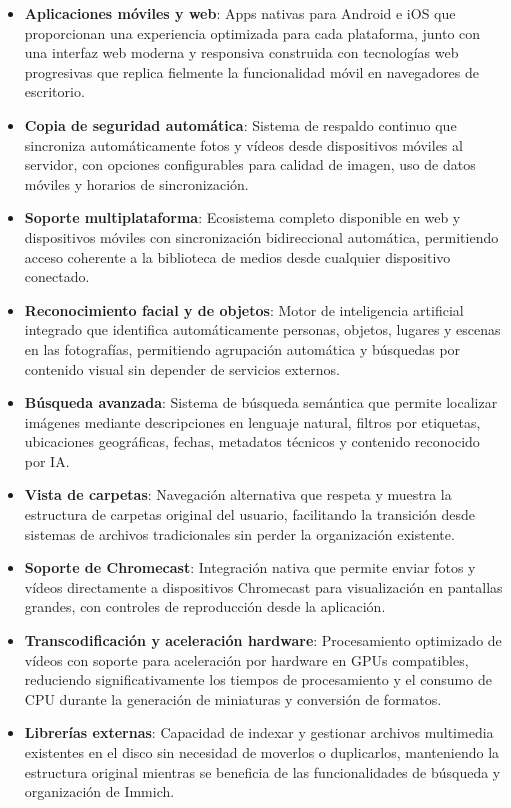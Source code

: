 \begin{itemize}
    \item \textbf{Aplicaciones móviles y web}: Apps nativas para Android e iOS que proporcionan una experiencia optimizada para cada plataforma, junto con una interfaz web moderna y responsiva construida con tecnologías web progresivas que replica fielmente la funcionalidad móvil en navegadores de escritorio.
    \item \textbf{Copia de seguridad automática}: Sistema de respaldo continuo que sincroniza automáticamente fotos y vídeos desde dispositivos móviles al servidor, con opciones configurables para calidad de imagen, uso de datos móviles y horarios de sincronización.
    \item \textbf{Soporte multiplataforma}: Ecosistema completo disponible en web y dispositivos móviles con sincronización bidireccional automática, permitiendo acceso coherente a la biblioteca de medios desde cualquier dispositivo conectado.
    \item \textbf{Reconocimiento facial y de objetos}: Motor de inteligencia artificial integrado que identifica automáticamente personas, objetos, lugares y escenas en las fotografías, permitiendo agrupación automática y búsquedas por contenido visual sin depender de servicios externos.
    \item \textbf{Búsqueda avanzada}: Sistema de búsqueda semántica que permite localizar imágenes mediante descripciones en lenguaje natural, filtros por etiquetas, ubicaciones geográficas, fechas, metadatos técnicos y contenido reconocido por IA.
    \item \textbf{Vista de carpetas}: Navegación alternativa que respeta y muestra la estructura de carpetas original del usuario, facilitando la transición desde sistemas de archivos tradicionales sin perder la organización existente.
    \item \textbf{Soporte de Chromecast}: Integración nativa que permite enviar fotos y vídeos directamente a dispositivos Chromecast para visualización en pantallas grandes, con controles de reproducción desde la aplicación.
    \item \textbf{Transcodificación y aceleración hardware}: Procesamiento optimizado de vídeos con soporte para aceleración por hardware en GPUs compatibles, reduciendo significativamente los tiempos de procesamiento y el consumo de CPU durante la generación de miniaturas y conversión de formatos.
    \item \textbf{Librerías externas}: Capacidad de indexar y gestionar archivos multimedia existentes en el disco sin necesidad de moverlos o duplicarlos, manteniendo la estructura original mientras se beneficia de las funcionalidades de búsqueda y organización de Immich.

\end{itemize}
